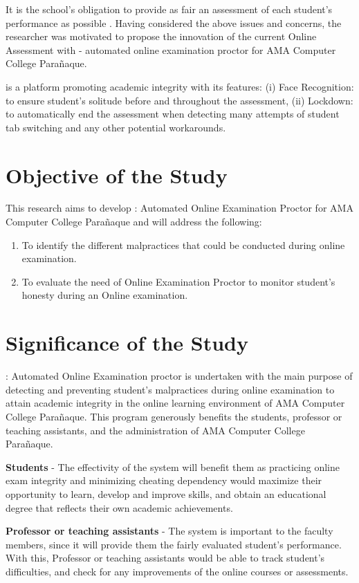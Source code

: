 It is the school’s obligation to provide as fair an assessment of each student’s performance as possible \cite{lundahl2010skolbedomningens}.
Having considered the above issues and concerns, the researcher was motivated to propose the innovation of the current Online Assessment with \projectName - automated online examination proctor for AMA Computer College Parañaque.

\projectName is a platform promoting academic integrity with its features: (i) Face Recognition: to ensure student’s solitude before and throughout the assessment, (ii) Lockdown: to automatically end the assessment when detecting many attempts of student tab switching and any other potential workarounds.

\section{Objective of the Study}
This research aims to develop \projectName: Automated Online Examination Proctor for AMA Computer College Parañaque and will address the following:
\begin{enumerate}
    \item To identify the different malpractices that could be conducted during online examination.
    \item To evaluate the need of Online Examination Proctor to monitor student's honesty during an Online examination.
\end{enumerate}

\section{Significance of the Study}

\projectName: Automated Online Examination proctor is undertaken with the main purpose of detecting and preventing student’s malpractices during online examination to attain academic integrity in the online learning environment of AMA Computer College Parañaque. This program generously benefits the students, professor or teaching assistants, and the administration of AMA Computer College Parañaque.

\textbf{Students} - The effectivity of the system will benefit them as practicing online exam integrity and minimizing cheating dependency would maximize their opportunity to learn, develop and improve skills, and obtain an educational degree that reflects their own academic achievements.

\textbf{Professor or teaching assistants} - The system is important to the faculty members, since it will provide them the fairly evaluated student’s performance. With this, Professor or teaching assistants would be able to track student’s difficulties, and check for any improvements of the online courses or assessments.

